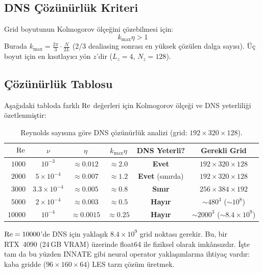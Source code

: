 \subsection{DNS Çözünürlük Kriteri}

Grid boyutunun Kolmogorov ölçeğini çözebilmesi için:
\begin{equation}
    k_{\max} \eta > 1
    \label{eq:dns_criterion}
\end{equation}
Burada $k_{\max} = \frac{2\pi}{3} \cdot \frac{N}{2L}$ (2/3 dealiasing sonrası en yüksek çözülen dalga sayısı). Üç boyut için en kısıtlayıcı yön $z$'dir ($L_z = 4$, $N_z = 128$).

\subsection{Çözünürlük Tablosu}

Aşağıdaki tabloda farklı $\mathrm{Re}$ değerleri için Kolmogorov ölçeği ve DNS yeterliliği özetlenmiştir:

\begin{table}[H]
\centering
\caption{Reynolds sayısına göre DNS çözünürlük analizi (grid: $192 \times 320 \times 128$).}
\label{tab:dns_resolution}
\begin{tabular}{rccccc}
\toprule
$\mathrm{Re}$ & $\nu$ & $\eta$ & $k_{\max}\eta$ & DNS Yeterli? & Gerekli Grid \\
\midrule
$1000$  & $10^{-3}$  & $\approx 0.012$  & $\approx 2.0$  & \textbf{Evet} & $192 \times 320 \times 128$ \\
$2000$  & $5 \times 10^{-4}$ & $\approx 0.007$ & $\approx 1.2$ & \textbf{Evet} (sınırda) & $192 \times 320 \times 128$ \\
$3000$  & $3.3 \times 10^{-4}$ & $\approx 0.005$ & $\approx 0.8$ & \textbf{Sınır} & $256 \times 384 \times 192$ \\
$5000$  & $2 \times 10^{-4}$ & $\approx 0.003$ & $\approx 0.5$ & \textbf{Hayır} & $\sim 480^3$ ($\sim 10^8$) \\
$10000$ & $10^{-4}$  & $\approx 0.0015$ & $\approx 0.25$ & \textbf{Hayır} & $\sim 2000^3$ ($\sim 8.4 \times 10^9$) \\
\bottomrule
\end{tabular}
\end{table}

\begin{remark}
$\mathrm{Re} = 10000$'de DNS için yaklaşık $8.4 \times 10^9$ grid noktası gerekir. Bu, bir RTX~4090 (24\,GB VRAM) üzerinde float64 ile fiziksel olarak imkânsızdır. İşte tam da bu yüzden INNATE gibi neural operator yaklaşımlarına ihtiyaç vardır: kaba gridde ($96 \times 160 \times 64$) LES tarzı çözüm üretmek.
\end{remark}


